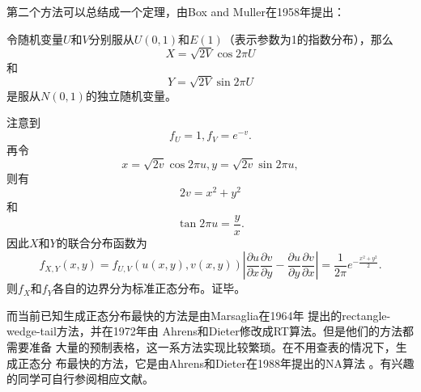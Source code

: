 第二个方法可以总结成一个定理，由Box and Muller在1958年\cite{Box1958A}提出：
\begin{theorem}{}
  令随机变量$U$和$V$分别服从$U(0, 1)$和$E(1)$（表示参数为1的指数分布），那么
  \begin{equation}
    X = \sqrt{2 V}\cos 2\pi U
    \label{eq::normal_box_muller_xi}
  \end{equation}
  和
  \begin{equation}
    Y = \sqrt{2 V}\sin 2\pi U
    \label{eq::normal_box_muller_eta}
  \end{equation}
  是服从$N(0, 1)$的独立随机变量。

   注意到
  $$
  f_U = 1, f_V = e^{-v}.
  $$
  再令
  $$
  x = \sqrt{2v}\cos 2\pi u, y = \sqrt{2v}\sin 2\pi u,
  $$
  则有  
  $$
  2 v = x^2 + y^2
  $$
  和
  $$
  \tan 2 \pi u =\frac{y}{x}.
  $$
  因此$X$和$Y$的联合分布函数为
  \begin{equation}
    f_{X, Y}(x, y) = f_{U, V}(u(x, y), v(x,
    y))\left|\frac{\partial u}{\partial x}\frac{\partial v}{\partial
      y} - \frac{\partial u}{\partial y}\frac{\partial v}{\partial
      x}\right| = \frac{1}{2 \pi}e^{-\frac{x^2 + y^2}{2}}.
  \end{equation}
  则$f_X$和$f_Y$各自的边界分为标准正态分布。证毕。
  \label{thm::normal_box_muller}
\end{theorem}

而当前已知生成正态分布最快的方法是由Marsaglia在1964年
\cite{Marsaglia1964A}提出的rectangle-wedge-tail方法，并在1972年由
Ahrens和Dieter修改成RT算法\cite{Dieter1973A}。但是他们的方法都需要准备
大量的预制表格，这一系方法实现比较繁琐。在不用查表的情况下，生成正态分
布最快的方法，它是由Ahrens和Dieter在1988年提出的NA算法
\cite{Ahrens1988Efficient}。有兴趣的同学可自行参阅相应文献。
